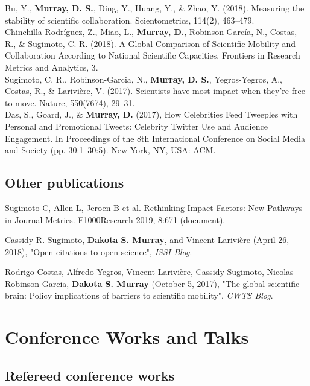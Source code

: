 \documentclass[10pt, a4paper]{article}
\newcommand{\years}[1]{\marginnote{\scriptsize #1}}
\begin{document}
\years{2018} \hangindent=0.7cm Bu, Y., \textbf{Murray, D. S.}, Ding, Y., Huang, Y., \& Zhao, Y. (2018). Measuring the stability of scientific collaboration. Scientometrics, 114(2), 463–479. \\

\years{2018} \hangindent=0.7cm Chinchilla-Rodríguez, Z., Miao, L., \textbf{Murray, D.}, Robinson-García, N., Costas, R., \& Sugimoto, C. R. (2018). A Global Comparison of Scientific Mobility and Collaboration According to National Scientific Capacities. Frontiers in Research Metrics and Analytics, 3. \\

\years{2017} \hangindent=0.7cm Sugimoto, C. R., Robinson-Garcia, N., \textbf{Murray, D. S.}, Yegros-Yegros, A., Costas, R., \& Larivière, V. (2017). Scientists have most impact when they’re free to move. Nature, 550(7674), 29–31. \\

\years{2017} \hangindent=0.7cm Das, S., Goard, J., \& \textbf{Murray, D.} (2017), How Celebrities Feed Tweeples with Personal and Promotional Tweets: Celebrity Twitter Use and Audience Engagement. In Proceedings of the 8th International Conference on Social Media and Society (pp. 30:1–30:5). New York, NY, USA: ACM. 

\subsection*{Other publications}
\noindent

\years{2019} \hangindent=0.7cm Sugimoto C, Allen L, Jeroen B et al. Rethinking Impact Factors: New Pathways in Journal Metrics. F1000Research 2019, 8:671 (document). 

\years{2018} \hangindent=0.7cm Cassidy R. Sugimoto, \textbf{Dakota S. Murray}, and Vincent Larivière (April 26, 2018), "Open citations to open science", \emph{ISSI Blog}. 

\years{2017} \hangindent=0.7cm Rodrigo Costas, Alfredo Yegros, Vincent Larivière, Cassidy Sugimoto, Nicolas Robinson-Garcia, \textbf{Dakota S. Murray} (October 5, 2017), "The global scientific brain: Policy implications of barriers to scientific mobility", \emph{CWTS Blog}. 

\section*{Conference Works and Talks}

\subsection*{Refereed conference works}
\end{document}
